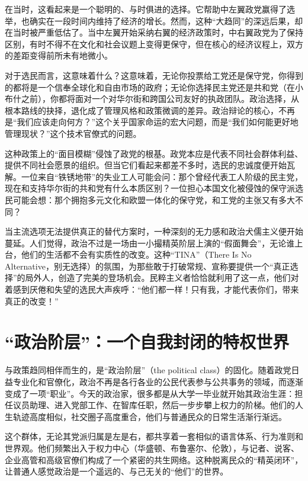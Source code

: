 在当时，这看起来是一个聪明的、与时俱进的选择。它帮助中左翼政党赢得了选举，也确实在一段时间内维持了经济的增长。然而，这种“大趋同”的深远后果，却在当时被严重低估了。当中左翼开始采纳右翼的经济政策时，中右翼政党为了保持区别，有时不得不在文化和社会议题上变得更保守，但在核心的经济议程上，双方的差距变得前所未有地微小。

对于选民而言，这意味着什么？这意味着，无论你投票给工党还是保守党，你得到的都将是一个信奉全球化和自由市场的政府；无论你选择民主党还是共和党（在小布什之前），你都将面对一个对华尔街和跨国公司友好的执政团队。政治选择，从根本路线的抉择，退化成了管理风格和政策微调的差异。政治辩论的核心，不再是“我们应该走向何方？”这个关乎国家命运的宏大问题，而是“我们如何能更好地管理现状？”这个技术官僚式的问题。

这种政策上的“面目模糊”侵蚀了政党的根基。政党本应是代表不同社会群体利益、提供不同社会愿景的组织。但当它们看起来都差不多时，选民的忠诚度便开始瓦解。一位来自“铁锈地带”的失业工人可能会问：那个曾经代表工人阶级的民主党，现在和支持华尔街的共和党有什么本质区别？一位担心本国文化被侵蚀的保守派选民可能会想：那个拥抱多元文化和欧盟一体化的保守党，和工党的主张又有多大不同？

当主流选项无法提供真正的替代方案时，一种深刻的无力感和政治犬儒主义便开始蔓延。人们觉得，政治不过是一场由一小撮精英阶层上演的“假面舞会”，无论谁上台，他们的生活都不会有实质性的改变。这种“TINA”（There Is No Alternative，别无选择）的氛围，为那些敢于打破常规、宣称要提供一个“真正选择”的局外人，创造了完美的登场机会。民粹主义者恰恰就利用了这一点，他们对着感到厌倦和失望的选民大声疾呼：“他们都一样！只有我，才能代表你们，带来真正的改变！”

\section{“政治阶层”：一个自我封闭的特权世界}

与政策趋同相伴而生的，是“政治阶层”（the political class）的固化。随着政党日益专业化和官僚化，政治不再是各行各业的公民代表参与公共事务的领域，而逐渐变成了一项“职业”。今天的政治家，很多都是从大学一毕业就开始其政治生涯：担任议员助理、进入党部工作、在智库任职，然后一步步攀上权力的阶梯。他们的人生轨迹高度相似，社交圈子高度重合，他们与普通民众的日常生活渐行渐远。

这个群体，无论其党派归属是左是右，都共享着一套相似的语言体系、行为准则和世界观。他们频繁出入于权力中心（华盛顿、布鲁塞尔、伦敦），与记者、说客、企业高管和高级官僚们构成了一个紧密的共生网络。这种脱离民众的“精英闭环”，让普通人感觉政治是一个遥远的、与己无关的“他们”的世界。

